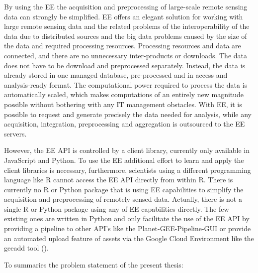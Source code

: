 By using the EE the acquisition and preprocessing of large-scale remote sensing data can strongly be simplified.
EE offers an elegant solution for working with large remote sensing data and the related problems of the interoperability of the data due to distributed sources and the big data problems caused by the size of the data and required processing resources. 
Processing resources and data are connected, and there are no unnecessary inter-products or downloads. 
The data does not have to be download and preprocessed separately. Instead, the data is already stored in one managed database, pre-processed and in access and analysis-ready format. 
The computational power required to process the data is automatically scaled, which makes computations of an entirely new magnitude possible without bothering with any IT management obstacles.
With EE, it is possible to request and generate precisely the data needed for analysis, while any acquisition, integration, preprocessing and aggregation is outsourced to the EE servers. 

However, the EE API is controlled by a client library, currently only available in JavaScript and Python. To use the EE additional effort to learn and apply the client libraries is necessary, furthermore, scientists using a different programming language like R cannot access the EE API directly from within R.
There is currently no R or Python package that is using EE capabilities to simplify the acquisition and preprocessing of remotely sensed data. Actually, there is not a single R or Python package using any of EE capabilities directly. The few existing ones are written in Python and only facilitate the use of the EE API by providing a pipeline to other API's like the Planet-GEE-Pipeline-GUI or provide an automated upload feature of assets via the Google Cloud Environment like the geeadd tool (\cite{roy2017google}).

\newpage
To summaries the problem statement of the present thesis:

